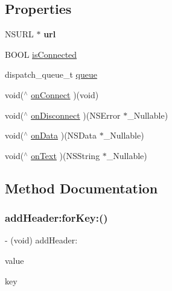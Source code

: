 \subsection*{Properties}
\begin{DoxyCompactItemize}
\item 
\hypertarget{interface_s_t_c_web_socket_af0cd2804dd85170e4894f947a8fb452f}{}\label{interface_s_t_c_web_socket_af0cd2804dd85170e4894f947a8fb452f} 
N\+S\+U\+RL $\ast$ {\bfseries url}
\item 
B\+O\+OL \hyperlink{interface_s_t_c_web_socket_a141075afd2a09ce60a8271f5d59860d8}{is\+Connected}
\item 
dispatch\+\_\+queue\+\_\+t \hyperlink{interface_s_t_c_web_socket_a66f1cc34b3be37883c97541270257bf2}{queue}
\item 
void($^\wedge$ \hyperlink{interface_s_t_c_web_socket_aec098d58709743122bd14d1b815f20cf}{on\+Connect} )(void)
\item 
void($^\wedge$ \hyperlink{interface_s_t_c_web_socket_af4387124567e05ec49d18a65c9079102}{on\+Disconnect} )(N\+S\+Error $\ast$\+\_\+\+Nullable)
\item 
void($^\wedge$ \hyperlink{interface_s_t_c_web_socket_af753eb23ff33a248c017d6a78c7756f6}{on\+Data} )(N\+S\+Data $\ast$\+\_\+\+Nullable)
\item 
void($^\wedge$ \hyperlink{interface_s_t_c_web_socket_afb945c824c6eba5a7e7bbc111366d076}{on\+Text} )(N\+S\+String $\ast$\+\_\+\+Nullable)
\end{DoxyCompactItemize}


\subsection{Method Documentation}
\hypertarget{interface_s_t_c_web_socket_a23fa67b7bee39fb6570f8d19fb2c38a2}{}\label{interface_s_t_c_web_socket_a23fa67b7bee39fb6570f8d19fb2c38a2} 
\subsubsection{\texorpdfstring{add\+Header\+:for\+Key\+:()}{addHeader:forKey:()}}
{\footnotesize\ttfamily -\/ (void) add\+Header\+: \begin{DoxyParamCaption}\item[{(nonnull N\+S\+String $\ast$)}]{value }\item[{forKey:(nonnull N\+S\+String $\ast$)}]{key }\end{DoxyParamCaption}}

